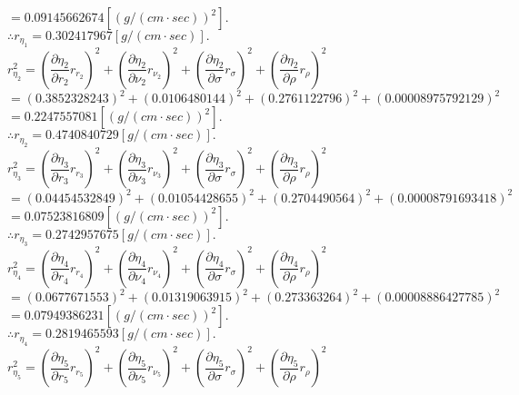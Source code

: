 \documentclass[a4paper,1pt]{jsarticle}
\begin{document}
$=0.09145662674[(g/(cm\cdot sec))^2].$\\

$\therefore r_{\eta _1}=0.302417967[g/(cm\cdot sec)].$\\

$r_{\eta _2}^2=(\dfrac{\partial \eta _2}{\partial r_2}r_{r_2})^2+(\dfrac{\partial \eta _2}{\partial \nu _2}r_{\nu _2})^2+(\dfrac{\partial \eta _2}{\partial \sigma }r_\sigma)^2+(\dfrac{\partial \eta _2}{\partial \rho }r_\rho )^2$\\

$=(0.3852328243)^2+(0.0106480144)^2+(0.2761122796)^2+(0.00008975792129)^2$\\

$=0.2247557081[(g/(cm\cdot sec))^2].$\\

$\therefore r_{\eta _2}=0.4740840729[g/(cm\cdot sec)].$\\

$r_{\eta _3}^2=(\dfrac{\partial \eta _3}{\partial r_3}r_{r_3})^2+(\dfrac{\partial \eta _3}{\partial \nu _3}r_{\nu _3})^2+(\dfrac{\partial \eta _3}{\partial \sigma }r_\sigma)^2+(\dfrac{\partial \eta _3}{\partial \rho }r_\rho )^2$\\

$=(0.04454532849)^2+(0.01054428655)^2+(0.2704490564)^2+(0.00008791693418)^2$\\

$=0.07523816809[(g/(cm\cdot sec))^2].$\\

$\therefore r_{\eta _3}=0.2742957675[g/(cm\cdot sec)].$\\

$r_{\eta _4}^2=(\dfrac{\partial \eta _4}{\partial r_4}r_{r_4})^2+(\dfrac{\partial \eta _4}{\partial \nu _4}r_{\nu _4})^2+(\dfrac{\partial \eta _4}{\partial \sigma }r_\sigma)^2+(\dfrac{\partial \eta _4}{\partial \rho }r_\rho )^2$\\

$=(0.0677671553)^2+(0.01319063915)^2+(0.273363264)^2+(0.00008886427785)^2$\\

$=0.07949386231[(g/(cm\cdot sec))^2].$\\

$\therefore r_{\eta _4}=0.2819465593[g/(cm\cdot sec)].$\\

$r_{\eta _5}^2=(\dfrac{\partial \eta _5}{\partial r_5}r_{r_5})^2+(\dfrac{\partial \eta _5}{\partial \nu _5}r_{\nu _5})^2+(\dfrac{\partial \eta _5}{\partial \sigma }r_\sigma)^2+(\dfrac{\partial \eta _5}{\partial \rho }r_\rho )^2$\\
\end{document}
